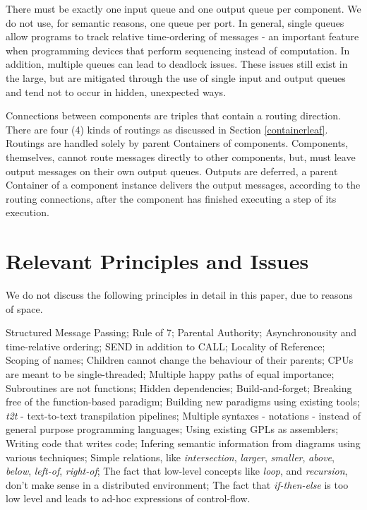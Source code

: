 \documentclass[10pt,anonymous,review]{acmart}
\begin{document}
There must be exactly one input queue and one output queue per component. We
do not use, for semantic reasons, one queue per port. In general, single
queues allow programs to track relative time-ordering of messages - an
important feature when programming devices that perform sequencing
instead of computation. In addition, multiple queues can lead to
deadlock issues. These issues still exist in the large, but are
mitigated through the use of single input and output queues and tend not
to occur in hidden, unexpected ways.

Connections between components are triples that contain a routing direction.
There are four (4) kinds of routings as discussed in Section \ref{containerleaf}.
Routings are handled solely by parent Containers of components. Components, themselves, cannot route messages directly to other components, but, must leave output messages on their own output queues. Outputs are deferred, a parent Container of a component instance delivers the output messages, according to the routing connections, after the component has finished executing a step of its execution.


\section{Relevant Principles and Issues}
We do not discuss the following principles in detail in this paper, due
to reasons of space.

Structured Message Passing;
Rule of 7;
Parental Authority;
Asynchronousity and time-relative ordering;
SEND in addition to CALL;
Locality of Reference;
Scoping of names;
Children cannot change the behaviour of their parents;
CPUs are meant to be single-threaded;
Multiple happy paths of equal importance;
Subroutines are not functions;
Hidden dependencies;
Build-and-forget;
Breaking free of the function-based paradigm;
Building new paradigms using existing tools;
\emph{t2t} - text-to-text transpilation pipelines;
Multiple syntaxes - notations - instead of general purpose programming languages;
Using existing GPLs as assemblers;
Writing code that writes code;
Infering semantic information from diagrams using various techniques;
Simple relations, like \emph{intersection}, \emph{larger}, \emph{smaller}, \emph{above}, \emph{below}, \emph{left-of}, \emph{right-of};
The fact that low-level concepts like \emph{loop}, and \emph{recursion}, don't make sense in a distributed environment;
The fact that \emph{if-then-else} is too low level and leads to ad-hoc expressions of control-flow.
\end{document}
